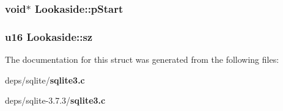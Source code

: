 \subsubsection{\setlength{\rightskip}{0pt plus 5cm}void$\ast$ \bf{Lookaside::p\-Start}}\label{structLookaside_910a4c95e55d966aad54f13351e0f5ff}


\subsubsection{\setlength{\rightskip}{0pt plus 5cm}\bf{u16} \bf{Lookaside::sz}}\label{structLookaside_7712a01b4edb0df5870e07a4662a89c4}




The documentation for this struct was generated from the following files:\begin{CompactItemize}
\item 
deps/sqlite/\bf{sqlite3.c}\item 
deps/sqlite-3.7.3/\bf{sqlite3.c}\end{CompactItemize}
